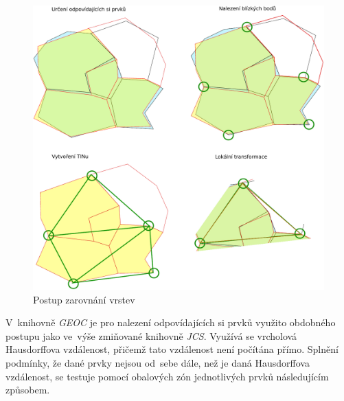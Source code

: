 \label{capic}
  \begin{figure}[hbt]
    \centering
      \includegraphics[width=350pt]{./pictures/ca-princip.pdf}
      \caption{Postup zarovnání vrstev}
      \label{fig:ca-princip}
  \end{figure}

V~knihovně \textit{GEOC} je pro nalezení odpovídajících si prvků využito 
obdobného postupu jako ve~výše zmiňované knihovně \textit{JCS}. Využívá 
se vrcholová Hausdorffova vzdálenost, přičemž tato vzdálenost není počítána 
přímo. Splnění podmínky, že dané prvky nejsou od~sebe dále, než je daná 
Hausdorffova vzdálenost, se testuje pomocí obalových zón jednotlivých prvků 
následujícím způsobem.

